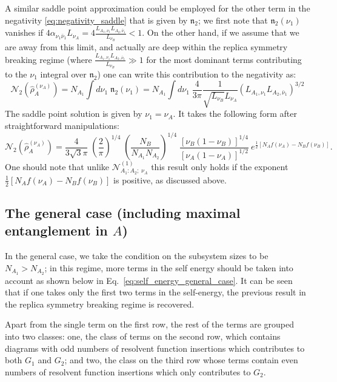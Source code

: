 \documentclass[aps,pra,reprint,superscriptaddress,twocolumn,notitlepage]{revtex4-1}
\numberwithin{equation}{section}
\begin{document}
\begin{widetext}
A similar saddle point approximation could be employed for the other term in the negativity \eqref{eq:negativity_saddle} that is given by $\mathfrak{n}_2$; we first note that $\mathfrak{n}_2(\nu_1)$ vanishes if     $4 \alpha_{\nu_1 \bar{\nu}_1 } L_{\nu_A} =  4 \frac{L_{A_1,\nu_1} L_{A_2,\bar{\nu}_1} }{L_{\nu_B}} < 1$. On the other hand, if we assume that we are away from this limit, and actually are deep within the replica symmetry breaking regime (where $\frac{L_{A_1,\nu_1} L_{A_2,\bar{\nu}_1} }{L_{\nu_B}} \gg 1$ for the most dominant terms contributing to the $\nu_1$ integral over $\mathfrak{n}_2$) one can write this contribution to the negativity as:
\begin{equation}
    \mathcal{N}_2(\hat\rho_A^{(\nu_A)})
    = N_{A_1} \int d\nu_1 \; \mathfrak{n}_{2}(\nu_1) = N_{A_1} \int d\nu_1 \; \frac{4}{3\pi} \frac{1}{\sqrt{L_{\nu_B}} L_{\nu_A}} \left( L_{A_1,\nu_1} L_{A_2,\bar{\nu}_1} \right)^{3/2}
\end{equation}
The saddle point solution is given by $\nu_1 = \nu_A$. It takes the following form after straightforward manipulations:
\begin{equation}
    \mathcal{N}_2(\hat\rho_A^{(\nu_A)})
    = \frac{4}{3\sqrt{3} \pi} \; \left(\frac{2}{\pi}\right)^{1/4} \;
    \left(\frac{N_B }{N_{A_1} N_{A_2}}\right)^{1/4} \; \frac{ \left[\nu_B(1-\nu_B) \right]^{1/4} }{\left[\nu_A(1-\nu_A) \right]^{1/2}} \ 
    e^{\frac12 \left[ N_A f(\nu_A) - N_B f(\nu_B) \right]}.
\end{equation}
One should note that unlike $\mathcal{N}_{A_1:A_2; \; \nu_A}^{(1)}$ this result only holds if the exponent $\frac12 \left[ N_A f(\nu_A) - N_B f(\nu_B) \right]$ is positive, as discussed above.


\end{widetext}

\subsection{The general case (including maximal entanglement in $A$)}
In the general case, we take the condition on the subsystem sizes to be $N_{A_1} > N_{A_2}$; in this regime, more terms in the self energy should be taken into account as shown below in Eq.~\eqref{eq:self_energy_general_case}. It can be seen that if one takes only the first two terms in the self-energy, the previous result in the replica symmetry breaking regime is recovered.

Apart from the single term on the first row, the rest of the terms are grouped into two classes: one, the class of terms on the second row, which contains diagrams with odd numbers of resolvent function insertions which contributes to both $G_1$ and $G_2$; and two, the class on the third row whose terms contain even numbers of resolvent function insertions which only contributes to $G_2$.
\end{document}
